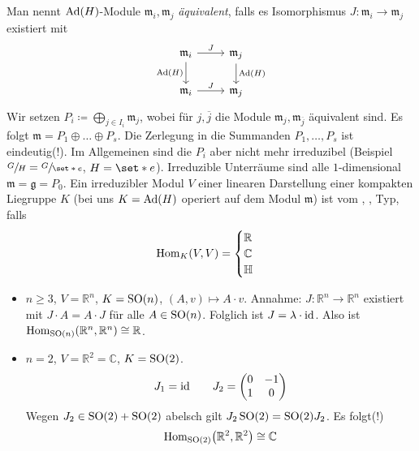 Man nennt $\operatorname{Ad}(H)$-Module $\mathfrak{m}_i, \mathfrak{m}_j$ \emph{äquivalent}, falls es Isomorphismus $J \colon \mathfrak{m}_i \to \mathfrak{m}_j$ existiert mit 
\[
	\begin{tikzcd}
		\mathfrak{m}_i\rar["J"] \dar["\Ad(H)"'] & \mathfrak{m}_j \dar["\Ad(H)"] \\
		\mathfrak{m}_i \rar["J"] & \mathfrak{m}_j
 	\end{tikzcd}
\]
Wir setzen $P_i \coloneqq \bigoplus_{j \in I_i} \mathfrak{m}_j$, wobei für $j, \overline{j}$ die Module $\mathfrak{m}_j, \mathfrak{m}_{\overline{j}}$ äquivalent sind. 
Es folgt $\mathfrak{m} = P_1 \oplus \ldots \oplus P_s$.
Die Zerlegung in die  Summanden $P_1, \ldots , P_s$ ist eindeutig(!).
Im Allgemeinen sind die $P_i$ aber nicht mehr irreduzibel (Beispiel $\sfrac{G}{H} = \sfrac{G}{\set*{e}}$, $H = \set*{e}$).
Irreduzible Unterräume sind alle $1$-dimensional $\mathfrak{m} = \mathfrak{g} = P_0$.
Ein irreduzibler Modul $V$ einer linearen Darstellung einer kompakten Liegruppe $K$ (bei uns $K = \operatorname{Ad}(H)$ operiert auf dem Modul $\mathfrak{m}$) ist vom , ,  Typ, falls
\[
	\operatorname{Hom}_K (V,V) = \begin{cases}
		\mathbb{R} &\\
		\mathbb{C} & \\
		\mathbb{H} &
	\end{cases}
\]

\begin{beispiel*}[{name=[lineare Darstellungen vom reellen Typ]}]
	\begin{itemize}
		\item $n \ge 3$, $V= \mathbb{R}^n$, $K= \operatorname{SO}(n)$, $(A,v) \mapsto A \cdot v$.
		Annahme: $J \colon \mathbb{R}^n \to \mathbb{R}^n$ existiert mit $J \cdot A = A \cdot J$ für alle $A \in \operatorname{SO}(n)$.
		Folglich ist $J = \lambda \cdot {\operatorname{id}}$. Also ist $\Hom_{\SO(n)} \enbrace*{\mathbb{R}^n,\mathbb{R}^n} \cong \mathbb{R}$.
		\item $n=2$, $V=\mathbb{R}^2 =\mathbb{C} $, $K=\operatorname{SO}(2)$.
		\[
			J_1 = {\operatorname{id}} \qquad J_2 = \begin{pmatrix}
				0 & -1 \\
				1 & 0
			\end{pmatrix}
		\]
		Wegen $J_2 \in  \operatorname{SO}(2) + \operatorname{SO}(2)$ abelsch gilt $J_2 \operatorname{SO}(2) = \operatorname{SO}(2) J_2$. Es folgt(!)
		\[
			\Hom_{\SO(2)} \enbrace*{\mathbb{R}^2,\mathbb{R}^2} \cong \mathbb{C}
		\]
	\end{itemize}
\end{beispiel*}


